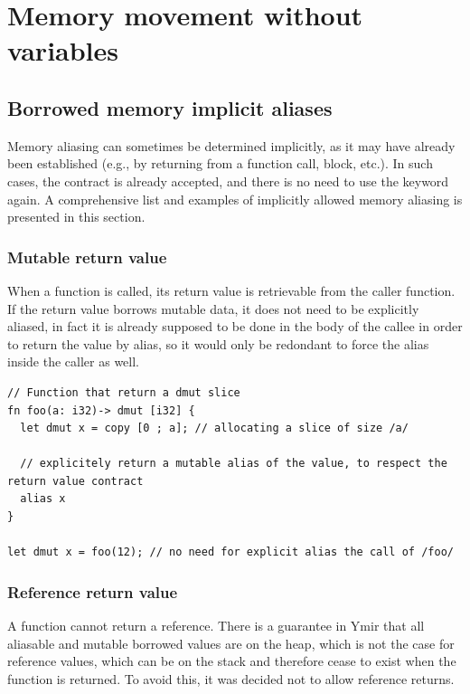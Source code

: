 \section{Memory movement without variables}%
\label{sec:memory:memory_movement}

\subsection{Borrowed memory implicit aliases}

Memory aliasing can sometimes be determined implicitly, as it may have already
been established (e.g., by returning from a function call, block, etc.). In such
cases, the contract is already accepted, and there is no need to use the keyword
 again. A comprehensive list and examples of implicitly allowed
memory aliasing is presented in this section.

\subsubsection*{Mutable return value}

When a function is called, its return value is retrievable from the caller
function. If the return value borrows mutable data, it does not need to be
explicitly aliased, in fact it is already supposed to be done in the body of the
callee in order to return the value by alias, so it would only be redondant to
force the alias inside the caller as well.

\begin{lstlisting}[style=coloredverbatim]
// Function that return a dmut slice
fn foo(a: i32)-> dmut [i32] {
  let dmut x = copy [0 ; a]; // allocating a slice of size /a/

  // explicitely return a mutable alias of the value, to respect the return value contract
  alias x
}

let dmut x = foo(12); // no need for explicit alias the call of /foo/
\end{lstlisting}

\subsubsection*{Reference return value}

A function cannot return a reference. There is a guarantee in Ymir that all
aliasable and mutable borrowed values are on the heap, which is not the case for
reference values, which can be on the stack and therefore cease to exist when
the function is returned. To avoid this, it was decided not to allow reference
returns.

